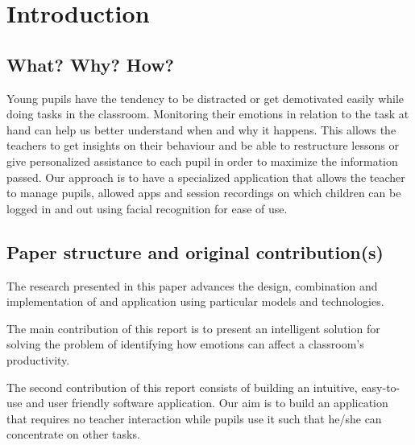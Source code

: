 \documentclass[runningheads,a4paper,11pt]{report}
\begin{document}
\tableofcontents

\newpage

\listoftables
\listoffigures
\listofalgorithms

\newpage




\newpage



 


\chapter{Introduction}
\label{chapter:introduction}

\section{What? Why? How?}
\label{section:what}

Young pupils have the tendency to be distracted or get demotivated easily while doing tasks in the classroom. Monitoring their emotions in relation to the task at hand can help us better understand when and why it happens. This allows the teachers to get insights on their behaviour and be able to restructure lessons or give personalized assistance to each pupil in order to maximize the information passed.
Our approach is to have a specialized application that allows the teacher to manage pupils, allowed apps and session recordings on which children can be logged in and out using facial recognition for ease of use.

\section{Paper structure and original contribution(s)}
\label{section:structure}

The research presented in this paper advances the design, combination and implementation of and application using particular models and technologies. 

The main contribution of this report is to present an intelligent solution for solving the problem of identifying how emotions can affect a classroom's productivity.

The second contribution of this report consists of building an intuitive, easy-to-use and user
friendly software application. Our aim is to build an application that requires no teacher interaction while pupils use it such that he/she can concentrate on other tasks.
\end{document}
